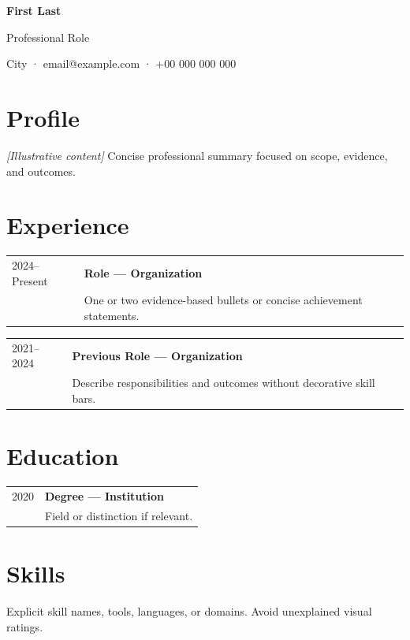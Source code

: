 \documentclass[10.5pt,a4paper]{scrartcl}
\makeatletter
\newcommand{\cvitem}[3]{\noindent\begin{tabularx}{\linewidth}{@{}p{.18\linewidth}X@{}}{\color{Muted}#1} & {\bfseries #2}\\ & #3\end{tabularx}\par\medskip}
\makeatother
\begin{document}
{\Huge\bfseries First Last\par}{\large Professional Role\par}{\color{Muted} City · email@example.com · +00 000 000 000\par}
\section*{Profile}\textit{[Illustrative content]} Concise professional summary focused on scope, evidence, and outcomes.
\section*{Experience}\cvitem{2024--Present}{Role — Organization}{One or two evidence-based bullets or concise achievement statements.}
\cvitem{2021--2024}{Previous Role — Organization}{Describe responsibilities and outcomes without decorative skill bars.}
\section*{Education}\cvitem{2020}{Degree — Institution}{Field or distinction if relevant.}
\section*{Skills}Explicit skill names, tools, languages, or domains. Avoid unexplained visual ratings.
\end{document}
